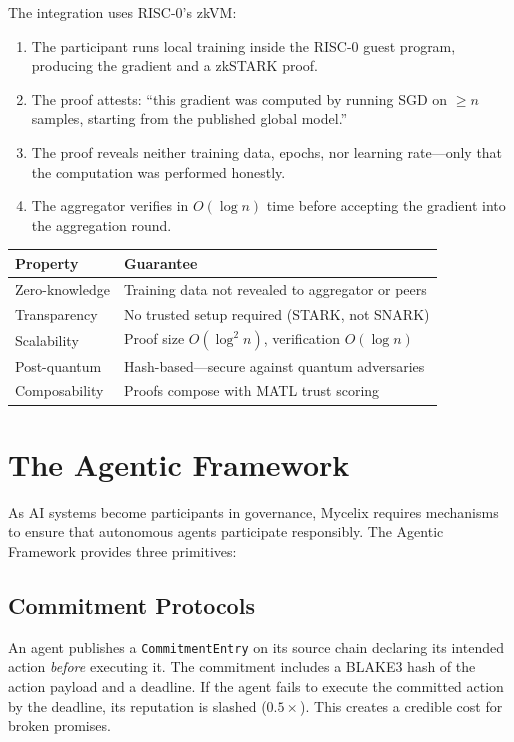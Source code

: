 \documentclass[12pt]{book}
\begin{document}
The integration uses RISC-0's zkVM:

\begin{enumerate}
  \item The participant runs local training inside the RISC-0 guest
    program, producing the gradient and a zkSTARK proof.
  \item The proof attests: ``this gradient was computed by running
    SGD on $\geq n$ samples, starting from the published global model.''
  \item The proof reveals neither training data, epochs, nor learning
    rate---only that the computation was performed honestly.
  \item The aggregator verifies in $O(\log n)$ time before accepting
    the gradient into the aggregation round.
\end{enumerate}

\begin{longtable}{lp{8cm}}
\toprule
\textbf{Property} & \textbf{Guarantee} \\
\midrule
\endhead
Zero-knowledge       & Training data not revealed to aggregator or peers \\
Transparency         & No trusted setup required (STARK, not SNARK) \\
Scalability          & Proof size $O(\log^2 n)$, verification $O(\log n)$ \\
Post-quantum         & Hash-based---secure against quantum adversaries \\
Composability        & Proofs compose with MATL trust scoring \\
\bottomrule
\end{longtable}

\section{The Agentic Framework}

As AI systems become participants in governance, Mycelix requires
mechanisms to ensure that autonomous agents participate responsibly.
The Agentic Framework provides three primitives:

\subsection{Commitment Protocols}

An agent publishes a \texttt{CommitmentEntry} on its source chain
declaring its intended action \emph{before} executing it.  The
commitment includes a BLAKE3 hash of the action payload and a
deadline.  If the agent fails to execute the committed action by
the deadline, its reputation is slashed ($0.5\times$).  This
creates a credible cost for broken promises.
\end{document}
